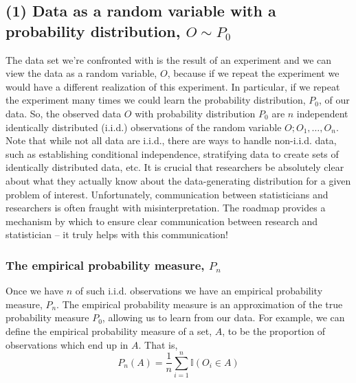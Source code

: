 \documentclass[
  12pt, krantz2,
]{book}
\theoremstyle{definition}
\theoremstyle{definition}
\theoremstyle{definition}
\newcommand{\1}{\mathbbm{1}}
\begin{document}
\hypertarget{data-as-a-random-variable-with-a-probability-distribution-o-sim-p_0}{%
\subsection*{\texorpdfstring{(1) Data as a random variable with a probability distribution, \(O \sim P_0\)}{(1) Data as a random variable with a probability distribution, O \textbackslash sim P\_0}}\label{data-as-a-random-variable-with-a-probability-distribution-o-sim-p_0}}


The data set we're confronted with is the result of an experiment and we can
view the data as a random variable, \(O\), because if we repeat the experiment
we would have a different realization of this experiment. In particular, if we
repeat the experiment many times we could learn the probability distribution,
\(P_0\), of our data. So, the observed data \(O\) with probability distribution
\(P_0\) are \(n\) independent identically distributed (i.i.d.) observations of the
random variable \(O; O_1, \ldots, O_n\). Note that while not all data are i.i.d.,
there are ways to handle non-i.i.d. data, such as establishing conditional
independence, stratifying data to create sets of identically distributed data,
etc. It is crucial that researchers be absolutely clear about what they actually
know about the data-generating distribution for a given problem of interest.
Unfortunately, communication between statisticians and researchers is often
fraught with misinterpretation. The roadmap provides a mechanism by which to
ensure clear communication between research and statistician -- it truly helps
with this communication!

\hypertarget{the-empirical-probability-measure-p_n}{%
\subsubsection*{\texorpdfstring{The empirical probability measure, \(P_n\)}{The empirical probability measure, P\_n}}\label{the-empirical-probability-measure-p_n}}


Once we have \(n\) of such i.i.d. observations we have an empirical probability
measure, \(P_n\). The empirical probability measure is an approximation of the
true probability measure \(P_0\), allowing us to learn from our data. For
example, we can define the empirical probability measure of a set, \(A\), to be
the proportion of observations which end up in \(A\). That is,
\begin{equation*}
  P_n(A) = \frac{1}{n}\sum_{i=1}^{n} \mathbb{I}(O_i \in A)
\end{equation*}
\end{document}
